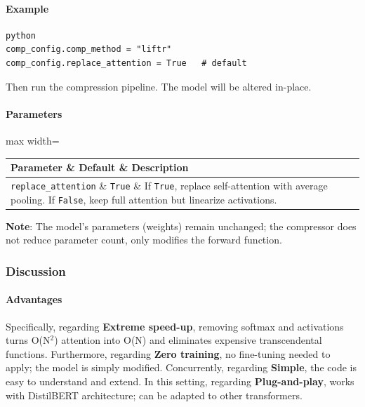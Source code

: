 \paragraph{Example}

\vspace{0.5em}
\begin{mdframed}[backgroundcolor=codebg, linecolor=codeframe, linewidth=1pt, roundcorner=4pt, innerleftmargin=2pt, innerrightmargin=5pt, innertopmargin=5pt, innerbottommargin=5pt]
\begin{lstlisting}
python
comp_config.comp_method = "liftr"
comp_config.replace_attention = True   # default
\end{lstlisting}
\end{mdframed}
\vspace{0.5em}

Then run the compression pipeline. The model will be altered in-place.

\paragraph{Parameters}

\begin{center}
\begin{adjustbox}{max width=\columnwidth}
\renewcommand{\arraystretch}{1.2}
\begin{tabular}{lll}
\toprule
Parameter \& Default \& Description \\
\midrule
\texttt{replace\_attention} \& \texttt{True} \& If \texttt{True}, replace self-attention with average pooling. If \texttt{False}, keep full attention but linearize activations. \\

\bottomrule
\end{tabular}
\end{adjustbox}
\end{center}
\textbf{Note}: The model's parameters (weights) remain unchanged; the compressor does not reduce parameter count, only modifies the forward function.


\subsubsection*{Discussion}

\paragraph{Advantages}

Specifically, regarding \textbf{Extreme speed-up}, removing softmax and activations turns O(N$^2$) attention into O(N) and eliminates expensive transcendental functions. Furthermore, regarding \textbf{Zero training}, no fine-tuning needed to apply; the model is simply modified. Concurrently, regarding \textbf{Simple}, the code is easy to understand and extend. In this setting, regarding \textbf{Plug-and-play}, works with DistilBERT architecture; can be adapted to other transformers.


